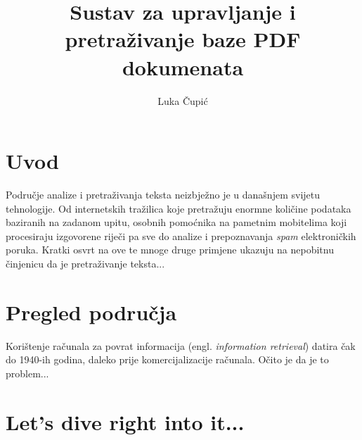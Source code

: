 \documentclass[times, utf8, zavrsni]{fer}
\begin{document}

\title{Sustav za upravljanje i pretraživanje baze PDF dokumenata}

\author{Luka Čupić}

\maketitle

\izvornik

\zahvala{}

\tableofcontents

\chapter{Uvod}
Područje analize i pretraživanja teksta neizbježno je u današnjem svijetu tehnologije. Od internetskih tražilica koje pretražuju enormne količine podataka baziranih na zadanom upitu, osobnih pomoćnika na pametnim mobitelima koji procesiraju izgovorene riječi pa sve do analize i prepoznavanja \textit{spam} elektroničkih poruka.
Kratki osvrt na ove te mnoge druge primjene ukazuju na nepobitnu činjenicu da je pretraživanje teksta...

\chapter{Pregled područja}
Korištenje računala za povrat informacija (engl. \textit{information retrieval}) datira čak do 1940-ih godina, daleko prije komercijalizacije računala. Očito je da je to problem...


\chapter{Let's dive right into it...}
\end{document}
